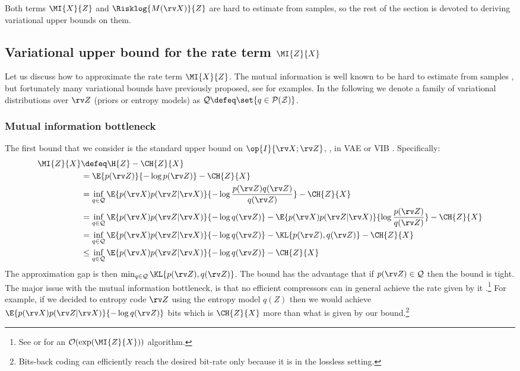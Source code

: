\documentclass[final]{article}
\begin{document}
Both terms $\MI{ X}{Z}$ and $\Risklog{M(\rv X)}{Z}$ are hard to estimate from samples, so the rest of the section is devoted to deriving variational upper bounds on them.


\subsection{Variational upper bound for the rate term \texorpdfstring{$\MI{Z}{X}$}{I[Z;X]}}
\label{appx:variational_rate}


Let us discuss how to approximate the rate term $\MI{X}{Z} $.
The mutual information is well known to be hard to estimate from samples \cite{paninski_estimation_2003,mcallester_formal_2020}, but fortunately many variational bounds have previously proposed, see \citet{poole_variational_2019} for examples.
In the following we denote a family of variational distributions over $\rv Z$ (priors or entropy models) as $\mathcal{Q} \defeq \set{q \in \mathcal{P}(\mathcal{Z})}$.


\subsubsection{Mutual information bottleneck}
\label{appx:mi_bottleneck}

 The first bound that we consider is the standard upper bound on $\op{I}{\rv X; \rv Z}$, \eg, in VAE \cite{kingma_auto-encoding_2014} or VIB \cite{alemi_deep_2017}.
Specifically:
\begin{align}
\MI{Z}{X} &\defeq \H{Z} - \CH{Z}{X} \\
&= \E{p(\rv Z)}{- \log p(\rv Z)} - \CH{Z}{X} \\
&= \inf_{q \in \mathcal{Q}} \E{p(\rv X)p(\rv Z | \rv X)}{- \log \frac{p(\rv Z)q(\rv Z)}{q(\rv Z)} } - \CH{Z}{X} \\
&= \inf_{q \in \mathcal{Q}}  \E{p(\rv X)p(\rv Z | \rv X)}{- \log q(\rv Z)} - \E{p(\rv X)p(\rv Z | \rv X)}{ \log \frac{p(\rv Z)}{q(\rv Z)} }   - \CH{Z}{X} \\
&= \inf_{q \in \mathcal{Q}}  \E{p(\rv X)p(\rv Z | \rv X)}{- \log q(\rv Z)} - \KL{p(\rv Z),q(\rv Z)}   - \CH{Z}{X} \\
&\leq \inf_{q \in \mathcal{Q}}   \E{p(\rv X)p(\rv Z | \rv X)}{- \log q(\rv Z)}  - \CH{Z}{X} \label{eq:IZX_bound}
\end{align}
The approximation gap is then $\min_{q \in \mathcal{Q}} \KL{p(\rv Z) , q(\rv Z)}$.
The bound has the advantage that if $p(\rv Z) \in \mathcal{Q}$ then the bound is tight.
The major issue with the mutual information bottleneck, is that no efficient compressors can in general achieve the rate given by it \citep{agustsson_universally_2020}.\footnote{
See \citet{flamich_compressing_2020} or \citet{schulman_sending_2020} for an $\mathcal{O}(\exp(\MI{Z}{X}))$ algorithm.
}
For example, if we decided to entropy code $\rv Z$ using the entropy model $q(Z)$ then we would achieve $\E{p(\rv X)p(\rv Z | \rv X)}{- \log q(\rv Z)}$ bits which is $\CH{Z}{X}$ more than what is given by our bound.\footnote{
Bits-back coding \citep{wallace_classification_1990} can efficiently reach the desired bit-rate only because it is in the lossless setting.
}
\end{document}
